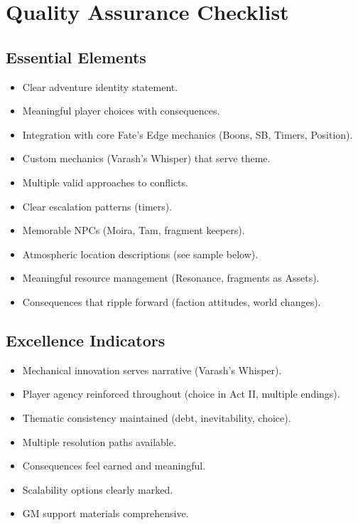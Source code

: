 \documentclass[11pt]{article}
\begin{document}
\section{Quality Assurance Checklist}
\subsection*{Essential Elements}
\begin{itemize}
    \item[$\checkmark$] Clear adventure identity statement.
    \item[$\checkmark$] Meaningful player choices with consequences.
    \item[$\checkmark$] Integration with core Fate's Edge mechanics (Boons, SB, Timers, Position).
    \item[$\checkmark$] Custom mechanics (Varash's Whisper) that serve theme.
    \item[$\checkmark$] Multiple valid approaches to conflicts.
    \item[$\checkmark$] Clear escalation patterns (timers).
    \item[$\checkmark$] Memorable NPCs (Moira, Tam, fragment keepers).
    \item[$\checkmark$] Atmospheric location descriptions (see sample below).
    \item[$\checkmark$] Meaningful resource management (Resonance, fragments as Assets).
    \item[$\checkmark$] Consequences that ripple forward (faction attitudes, world changes).
\end{itemize}

\subsection*{Excellence Indicators}
\begin{itemize}
    \item[$\checkmark$] Mechanical innovation serves narrative (Varash's Whisper).
    \item[$\checkmark$] Player agency reinforced throughout (choice in Act II, multiple endings).
    \item[$\checkmark$] Thematic consistency maintained (debt, inevitability, choice).
    \item[$\checkmark$] Multiple resolution paths available.
    \item[$\checkmark$] Consequences feel earned and meaningful.
    \item[$\checkmark$] Scalability options clearly marked.
    \item[$\checkmark$] GM support materials comprehensive.
\end{itemize}
\end{document}
